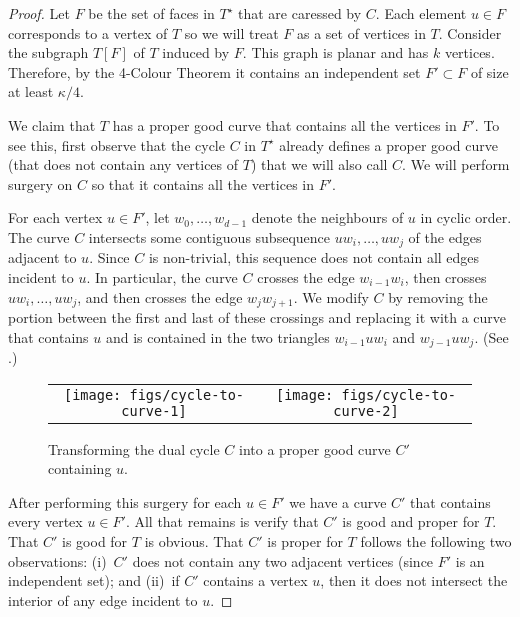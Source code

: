 \documentclass{patmorin}
\newcommand{\dual}[1]{{#1}^\star}
\begin{document}
\begin{proof}
  Let $F$ be the set of faces in $\dual{T}$ that are caressed by $C$. Each
  element $u\in F$ corresponds to a vertex of $T$ so we will treat $F$
  as a set of vertices in $T$.  Consider the subgraph $T[F]$ of $T$
  induced by $F$.  This graph is planar and has $k$ vertices. Therefore,
  by the 4-Colour Theorem it contains an independent set $F'\subset F$
  of size at least $\kappa/4$.

  We claim that $T$ has a proper good curve that contains all the vertices
  in $F'$.  To see this, first observe that the cycle $C$ in $\dual{T}$
  already defines a proper good curve (that does not contain any vertices
  of $T$) that we will also call $C$.  We will perform surgery on $C$
  so that it contains all the vertices in $F'$.

  For each vertex $u\in F'$, let $w_0,\ldots,w_{d-1}$ denote the
  neighbours of $u$ in cyclic order.  The curve $C$ intersects some
  contiguous subsequence $uw_i,\ldots,uw_j$ of the edges adjacent
  to $u$.  Since $C$ is non-trivial, this sequence does not contain all
  edges incident to $u$. In particular, the curve $C$ crosses the edge
  $w_{i-1}w_i$, then crosses
  $uw_i,\ldots,uw_j$, and then crosses the edge $w_j w_{j+1}$.  We modify
  $C$ by removing the portion between the first and last of these crossings
  and replacing it with a curve that contains $u$ and is contained in the
  two triangles $w_{i-1}uw_i$ and $w_{j-1}uw_j$. (See .)

  \begin{figure}
     \begin{center}
	\begin{tabular}{cc}
		\texttt{[image: figs/cycle-to-curve-1]} &
		\texttt{[image: figs/cycle-to-curve-2]}
	\end{tabular}
     \end{center}
     \caption{Transforming the dual cycle $C$ into a proper good curve $C'$ containing $u$.}
  \end{figure}

  After performing this surgery for each $u\in F'$ we have a curve $C'$
  that contains every vertex $u\in F'$.  All that remains is verify that
  $C'$ is good and proper for $T$. That $C'$ is good for $T$ is
  obvious.  That $C'$ is proper for $T$ follows the following two observations:
  (i)~$C'$ does not contain any two adjacent vertices (since $F'$ is an
  independent set); and (ii)~if $C'$ contains a vertex $u$, then it does
  not intersect the interior of any edge incident to $u$.
\end{proof}
\end{document}
